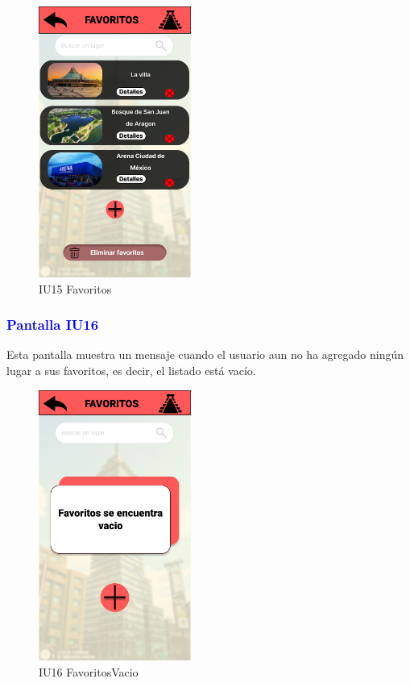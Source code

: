    \begin{figure}[htb]
        \centering
        \includegraphics[width= 5cm]{Pantallas Prototipo3/IU23 Pantalla Favoritos.jpg}
        \caption{IU15 Favoritos}
        \label{fig:enter-label}
    \end{figure}

\subsubsection{\textcolor{blue}{Pantalla IU16}}
Esta pantalla muestra un mensaje cuando el usuario aun no ha agregado ningún lugar a sus favoritos, es decir, el listado está vacío.

    \begin{figure}[htb]
        \centering
        \includegraphics[width= 5cm]{Pantallas Prototipo3/IU25 Pantalla Favoritos vacio.jpg}
        \caption{IU16 FavoritosVacio}
        \label{fig:enter-label}
    \end{figure}

